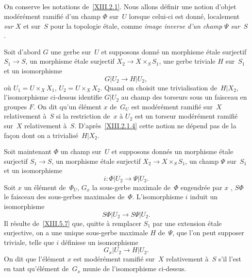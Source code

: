 \subsection{}
\label{XIII.2.2}
On conserve les notations de~\ref{XIII.2.1}. Nous allons d\'efinir
une notion d'objet mod\'er\'ement ramifi\'e d'un champ $\Phi$
sur~$U$ lorsque celui-ci est donn\'e, localement \emph{sur} $X$ et
sur~$S$ pour la topologie \'etale, comme \emph{image inverse d'un
champ} $\Psi$ \emph{sur}~$S$.

Soit d'abord $G$ une gerbe sur~$U$ et supposons donn\'e un morphisme
\'etale surjectif $S_1\to S$, un morphisme \'etale surjectif
$X_2\to X\times_S S_1$, une gerbe triviale $H$ sur~$S_1$ et un
isomorphisme
$$
G|{U_2}\to H|{U_2},
$$
o\`u
$U_1=U\times_X X_1$, $U_2=U\times_X X_2$. Quand on choisit une
trivialisation de~$H|{X_2}$, l'isomorphisme ci-dessus identifie
$G|{U_2}$ au champ des torseurs sous un faisceau en groupes $F$. On
dit qu'un \'el\'ement $x$ de~$G_U$ est mod\'er\'ement
ramifi\'e sur~$X$ relativement
\`a~$S$
si la restriction de~$x$
\`a $U_2$ est un torseur mod\'er\'ement ramifi\'e sur~$X$
relativement \`a~$S$. D'apr\`es~\ref{XIII.2.1.4} cette notion ne
d\'epend pas de la fa\c con dont on a trivialis\'e~$H|X_2$.

Soit maintenant $\Phi$ un champ sur~$U$ et supposons donn\'es un
morphisme \'etale surjectif $S_1\to S$, un morphisme \'etale
surjectif $X_2\to X\times_S S_1$, un champ $\Psi$ sur~$S_1$ et un
isomorphisme
$$
i\colon \Phi|U_2\to \Psi|U_2.
$$
Soit $x$ un \'el\'ement de~$\Phi_U$, $G_x$ la sous-gerbe maximale
de~$\Phi$ engendr\'ee par $x$
\cite[III~2.1.7]{XIII.1}, $S\Phi$ le faisceau des
sous-gerbes maximales de~$\Phi$. L'isomorphisme $i$ induit un
isomorphisme
$$
S\Phi|U_2\to S\Psi|U_2.
$$
Il r\'esulte de~\ref{XIII.5.7} que, quitte \`a remplacer $S_1$ par
une extension \'etale surjective, on a une unique sous-gerbe
maximale $H$ de~$\Psi$, que l'on peut supposer triviale, telle que $i$
d\'efinisse un isomorphisme
$$
G_x|U_2\to H|U_2.
$$
On dit que l'\'el\'ement $x$ est mod\'er\'ement ramifi\'e
sur~$X$ relativement \`a~$S$ s'il l'est en tant qu'\'el\'ement
de~$G_x$ munie de l'isomorphisme ci-dessus.

